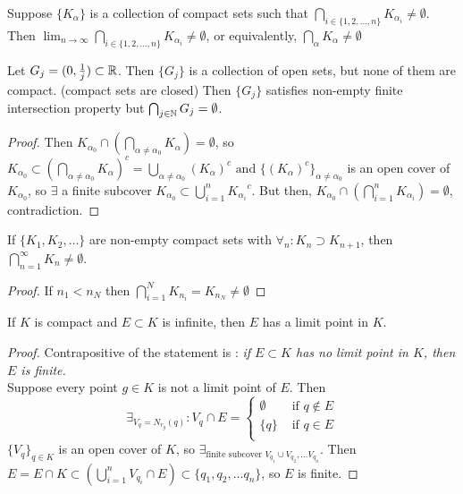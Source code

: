 \begin{theorem}
	Suppose $\{K_\alpha\} $ is a collection of compact sets such that $\bigcap_{i \in \{1,2, \ldots, n\} } K_{\alpha_i} \neq \emptyset$. Then
	$\lim_{n\to \infty}{\bigcap_{i \in \{1,2, \ldots ,n\}}K_{\alpha_i}}\neq \emptyset$, or equivalently, $\bigcap_{\alpha} K_{\alpha} \neq \emptyset $
	\begin{example}
		Let $G_j=(0,\frac{1}{j}) \subset \mathbb{R}$. Then $\{G_j\}$ is a collection of open sets, but none of them are compact. (compact sets are closed)
		Then $\{G_j\}$ satisfies non-empty finite intersection property but $\bigcap_{j \in \mathbb{N} }G_j=\emptyset$.
	\end{example}
	\begin{proof}
		Then $K_{\alpha_0} \cap \left( \bigcap_{\alpha\neq \alpha_0}K_{\alpha} \right)=\emptyset$, so $K_{\alpha_0} \subset \left( \bigcap_{\alpha\neq \alpha_0}K_{\alpha}\right)^{c}=\bigcup_{\alpha\neq \alpha_0}\left( K_{\alpha}\right)^{c} \text{ and } \{\left( K_{\alpha} \right)^{c}\}_{\alpha\neq \alpha_0}$ is an open cover of $K_{\alpha_0}$, so $\exists$ a finite subcover $K_{\alpha_0} \subset \bigcup_{i=1}^{n} {K_{\alpha_i}}^{c} $. But then, $K_{\alpha_0} \cap  \left(\bigcap_{i=1}^{n}K_{\alpha_i}   \right)=\emptyset  $, contradiction.
	\end{proof}
	\begin{corollary}
		If $\{K_1,K_2, \ldots \} $ are non-empty compact sets with $\forall_{n}: K_n \supset K_{n+1}$, then $\bigcap_{n=1}^{\infty}K_n \neq \emptyset$.
	\end{corollary}
	\begin{proof}
		If $n_1<n_N$ then $\bigcap_{i=1}^{N}K_{n_i}=K_{n_N}\neq \emptyset $
	\end{proof}

\end{theorem}

\begin{theorem}
	If $K$ is compact and $E \subset K$ is infinite, then $E$ has a limit point in $K$.
	\begin{proof}
		Contrapositive of the statement is : \textit{if $E \subset K$ has no limit point in $K$, then $E$ is finite.}\\
		Suppose every point $g \in K$ is not a limit point of $E$.
		Then \[\exists_{V_q= N_{r_g}(q)}: V_q \cap E =
			\begin{cases}
				\emptyset & \text{ if $q \not\in E$} \\
				\{q\}     & \text{ if $q \in E$}     \\
			\end{cases}\]
		$\{V_q\}_{q \in K}$ is an open cover of $K$, so $\exists_{\text{finite subcover } V_{q_1} \cup V_{q_2}, \ldots V_{q_n}}$. Then $E=E \cap K \subset \left( \bigcup_{i=1}^{n}{V_{q_i}} \cap  E \right) \subset \{q_1,q_2, \ldots q_n\} $, so $E$ is finite.

	\end{proof}
\end{theorem}

